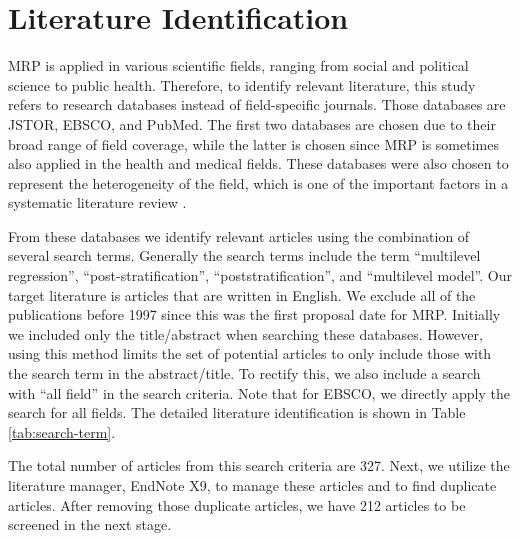 \documentclass{monashthesis}
\begin{document}
\hypertarget{literature-identification}{%
\section{Literature Identification}\label{literature-identification}}

MRP is applied in various scientific fields, ranging from social and political science to public health. Therefore, to identify relevant literature, this study refers to research databases instead of field-specific journals. Those databases are JSTOR, EBSCO, and PubMed. The first two databases are chosen due to their broad range of field coverage, while the latter is chosen since MRP is sometimes also applied in the health and medical fields. These databases were also chosen to represent the heterogeneity of the field, which is one of the important factors in a systematic literature review \autocite{SchweizerMarinL2017Apgt}.

From these databases we identify relevant articles using the combination of several search terms. Generally the search terms include the term ``multilevel regression'', ``post-stratification'', ``poststratification'', and ``multilevel model''. Our target literature is articles that are written in English. We exclude all of the publications before 1997 since this was the first proposal date for MRP. Initially we included only the title/abstract when searching these databases. However, using this method limits the set of potential articles to only include those with the search term in the abstract/title. To rectify this, we also include a search with ``all field'' in the search criteria. Note that for EBSCO, we directly apply the search for all fields. The detailed literature identification is shown in Table \ref{tab:search-term}.

The total number of articles from this search criteria are 327. Next, we utilize the literature manager, EndNote X9, to manage these articles and to find duplicate articles. After removing those duplicate articles, we have 212 articles to be screened in the next stage.
\end{document}
